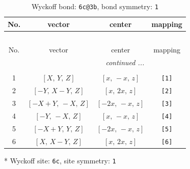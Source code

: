 \documentclass[fleqn,8pt]{jsarticle}
\begin{document}
\renewcommand{\arraystretch}{1.2}
\begin{longtable}{cccc}
\caption{Wyckoff bond: {\tt 6c@3b}, bond symmetry: {\tt 1}}
 \\
 \hline \hline
No. & vector & center & mapping \\ \hline \endfirsthead

\multicolumn{3}{l}{\tablename\ \thetable{}} \\
 \hline \hline
No. & vector & center & mapping \\ \hline \endhead

 \hline \hline
\multicolumn{3}{r}{\footnotesize\it continued ...} \\ \endfoot

 \hline \hline
\multicolumn{3}{r}{} \\ \endlastfoot

1 & $\left[ X,\, Y,\, Z \right]$ & $\left[ x,\, - x,\, z \right]$ & {\tt [1]} \\ \hline
2 & $\left[ - Y,\, X - Y,\, Z \right]$ & $\left[ x,\, 2 x,\, z \right]$ & {\tt [2]} \\ \hline
3 & $\left[ - X + Y,\, - X,\, Z \right]$ & $\left[ - 2 x,\, - x,\, z \right]$ & {\tt [3]} \\ \hline
4 & $\left[ - Y,\, - X,\, Z \right]$ & $\left[ x,\, - x,\, z \right]$ & {\tt [4]} \\ \hline
5 & $\left[ - X + Y,\, Y,\, Z \right]$ & $\left[ - 2 x,\, - x,\, z \right]$ & {\tt [5]} \\ \hline
6 & $\left[ X,\, X - Y,\, Z \right]$ & $\left[ x,\, 2 x,\, z \right]$ & {\tt [6]} \\
\end{longtable}
* Wyckoff site: {\tt 6c}, site symmetry: {\tt 1}
\renewcommand{\arraystretch}{1.2}
\end{document}
